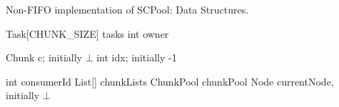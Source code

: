 \begin{algo}[!ht]
\caption{Non-FIFO implementation of SCPool: Data Structures.} 
\label{alg:non-fifo-ds}
\scriptsize
\begin{minipage}[t]{0.48\textwidth}
\begin{distribalgo}[1]
\smallskip

	\STATE Task[CHUNK\_SIZE] tasks 
  \STATE int owner 
\ENDINDENT

  \STATE Chunk c; initially $\bot$
  \STATE int idx; initially -1
\ENDINDENT

\setcounter{alg:non-fifo:lines}{\value{ALC@line}} %
\end{distribalgo}
\end{minipage}%
%
\hfill
%
\begin{minipage}[t]{0.48\textwidth}
%
\begin{distribalgo}[1]
\setcounter{ALC@line}{\value{alg:non-fifo:lines}}
\smallskip

  \STATE int consumerId
  \STATE List[] chunkLists  
  \STATE ChunkPool chunkPool 
  \STATE Node currentNode, initially $\bot$  
\ENDINDENT

\setcounter{alg:non-fifo:lines}{\value{ALC@line}}
\end{distribalgo}
\end{minipage}
\end{algo}

